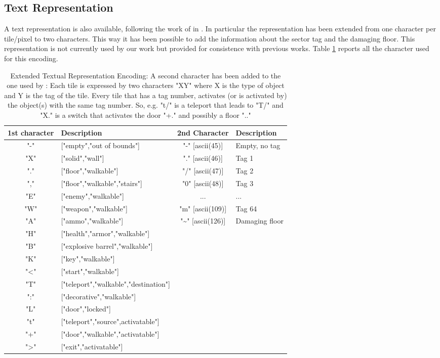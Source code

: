 \subsection{Text Representation}
\label{textrep}
A text representation is also available, following the work of \citeauthor{VGLC} in \cite{VGLC}. In particular the representation has been extended from one character per tile/pixel to two characters. This way it has been possible to add the information about the sector tag and the damaging floor. This representation is not currently used by our work but provided for consistence with previous works. Table \ref{tab:textmap} reports all the character used for this encoding.


\begin{table}
	\begin{tabularx}{\textwidth}{| c | l | c | X | }
		\hline
		\textbf{1st character} & \textbf{Description} & \textbf{2nd Character} & \textbf{Description} \\
		\hline
		"-" &	["empty","out of bounds"] &	"-" [ascii(45)] &	Empty, no tag \\
		"X" &	["solid","wall"] &	"." [ascii(46)] &	Tag 1 \\
		"." &	["floor","walkable"] &	"/" [ascii(47)] &	Tag 2 \\
		"," &	["floor","walkable","stairs"] &	"0" [ascii(48)] &	Tag 3 \\
		"E" &	["enemy","walkable"] &	... &	... \\
		"W" &	["weapon","walkable"] &	"m" [ascii(109)] &	Tag 64 \\
		"A" &	["ammo","walkable"] &	"\textasciitilde" [ascii(126)] &	Damaging floor \\
		"H" &	["health","armor","walkable"]	 &	 & \\
		"B" &	["explosive barrel","walkable"]	 &	 & \\
		"K" &	["key","walkable"]		 & & \\
		"\textless" &	["start","walkable"]		 & & \\
		"T" &	["teleport","walkable","destination"]		 & & \\
		":" &	["decorative","walkable"]		 & & \\
		"L" &	["door","locked"]		 & & \\
		"t" &	["teleport","source",activatable"]	 &	 & \\
		"+" &	["door","walkable","activatable"]		 & & \\
		"\textgreater" &	["exit","activatable"]		 & & \\
		\hline
	\end{tabularx}
	\caption[Textual Representation Encoding]{Extended Textual Representation Encoding: A second character has been added to the one used by : Each tile is expressed by two characters "XY" where X is the type of object and Y is the tag of the tile.
		Every tile that has a tag number, activates (or is activated by) the object(s) with the same tag number. 
		So, e.g. "t/" is a teleport that leads to "T/" and "X." is a switch that activates the door "+." and possibly a floor ".."}
	\label{tab:textmap}
\end{table}


